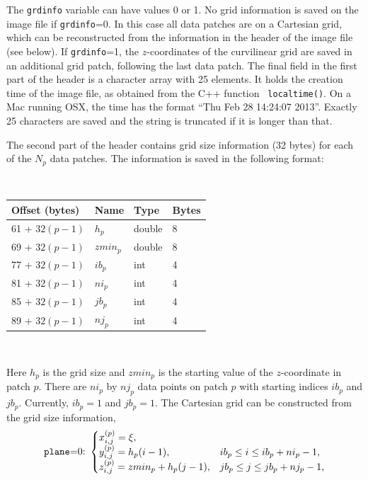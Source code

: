 \documentclass[11pt]{report}
\begin{document}
The {\tt grdinfo} variable can have values 0 or 1. No grid information is saved on the image file if
{\tt grdinfo}=0. In this case all data patches are on a Cartesian grid, which can be reconstructed
from the information in the header of the image file (see below). If {\tt grdinfo}=1, the
$z$-coordinates of the curvilinear grid are saved in an additional grid patch, following
the last data patch. The final field in the first part of the header is a character array with 25
elements. It holds the creation time of the image file, as obtained from the C++ function {\tt
  localtime()}. On a Mac running OSX, the time has the format ``Thu Feb 28 14:24:07 2013''. Exactly
25 characters are saved and the string is truncated if it is longer than that.

The second part of the header contains grid size information (32 bytes)
for each of the $N_p$ data patches. The information is saved in the following format:
{\samepage
\begin{center}
\hspace{-35mm}{\tt for ($p=1$; $p\leq N_p$; $p$++)}\nopagebreak \\ 
\vspace{2mm}
\begin{tabular}{llll}\hline
Offset (bytes) & Name & Type & Bytes \\ \hline
61 + $32(p - 1)$ & $h_{p}$ & double & 8 \\ \hline
69 + $32(p - 1)$ & $zmin_{p}$ & double & 8 \\ \hline
77 + $32(p - 1)$ & $ib_{p}$ & int & 4 \\ \hline
81 + $32(p - 1)$ & $ni_{p}$ & int & 4 \\ \hline
85 + $32(p - 1)$ & $jb_{p}$ & int & 4 \\ \hline
89 + $32(p - 1)$ & $nj_{p}$ & int & 4 \\ \hline
\end{tabular}\\
\end{center}
}
Here $h_p$ is the grid size and $zmin_p$ is the starting value of the $z$-coordinate in patch
$p$. There are $ni_p$ by $nj_p$ data points on patch $p$ with starting indices $ib_p$ and
$jb_p$. Currently, $ib_p=1$ and $jb_p=1$. The Cartesian grid can be constructed from the
grid size information,
\[
\mbox{{\tt plane}=0:}\ \begin{cases}
x^{(p)}_{i,j} = \xi,\\
y^{(p)}_{i,j} = h_p(i-1),& ib_p\leq i\leq ib_p+ni_p-1,\\
z^{(p)}_{i,j} = zmin_p + h_p(j-1),& jb_p\leq j\leq jb_p+nj_p-1,
\end{cases}
\]
\end{document}
